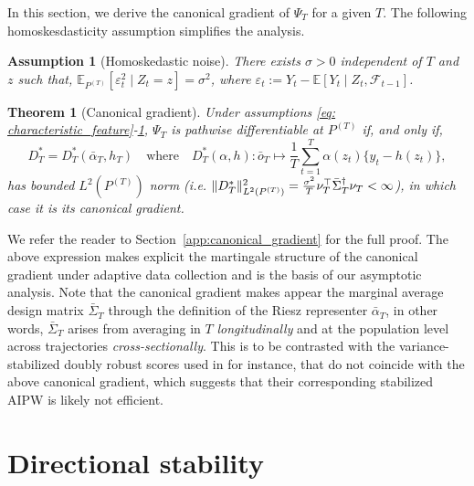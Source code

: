 \documentclass[11pt]{article}
\newtheorem{thm}{Theorem}
\newtheorem{assum}{Assumption}
\begin{document}
In this section, we derive the canonical gradient of $\Psi_T$ for a given $T$. The following homoskesdasticity assumption simplifies the analysis.
\begin{assum}[Homoskedastic noise]
\label{ass: homoschedastic}
There exists $\sigma > 0$ independent of $T$ and $z$ such that, $\mathbb{E}_{P^{(T)}}[\varepsilon_t^2 \mid Z_t = z] = \sigma^2$, where $\varepsilon_t := Y_t - \mathbb{E}[Y_t\mid Z_t, \mathcal{F}_{t-1}]$.
\end{assum}
\begin{thm}[Canonical gradient]
\label{thm: sp_can_grad}
Under assumptions \ref{eq: characteristic_feature}-\ref{ass: homoschedastic}, $\Psi_T$ is pathwise differentiable at $P^{(T)}$ if, and only if, 
\begin{equation}
\label{eq:canonical_gradient}
D^{\ast}_T = D^*_T(\bar \alpha_T, h_T) \quad \text{where} \quad D_T^*(\alpha, h): \bar{o}_T  \mapsto \frac{1}{T}\sum_{t=1}^T
\alpha(z_t)\bigl\{y_t-h(z_t)\bigr\},
\end{equation}
has bounded $L^2(P^{(T)})$ norm (i.e. $\|D^{\ast}_T\|^2_{L^{2}(P^{(T)})} = \frac{\sigma^2}{T}\nu_T^{\top}\Bar{\Sigma}_T^{\dag}\nu_T < \infty$), in which case it is its canonical gradient.
\end{thm}

We refer the reader to Section~\ref{app:canonical_gradient} for the full proof. The above expression makes explicit the martingale structure of the canonical gradient under adaptive data collection and is the basis of our asymptotic analysis. Note that the canonical gradient makes appear the marginal average design matrix $\bar \Sigma_T$ through the definition of the Riesz representer $\bar \alpha_T$, in other words, $\bar\Sigma_T$ arises from averaging in $T$ \textit{longitudinally} and at the population level across trajectories \textit{cross-sectionally}. This is to be contrasted with the variance-stabilized doubly robust scores used in \citep{bibaut2021post} for instance, that do not coincide with the above canonical gradient, which suggests that their corresponding stabilized AIPW is likely not efficient. 

\section{Directional stability}
\end{document}
